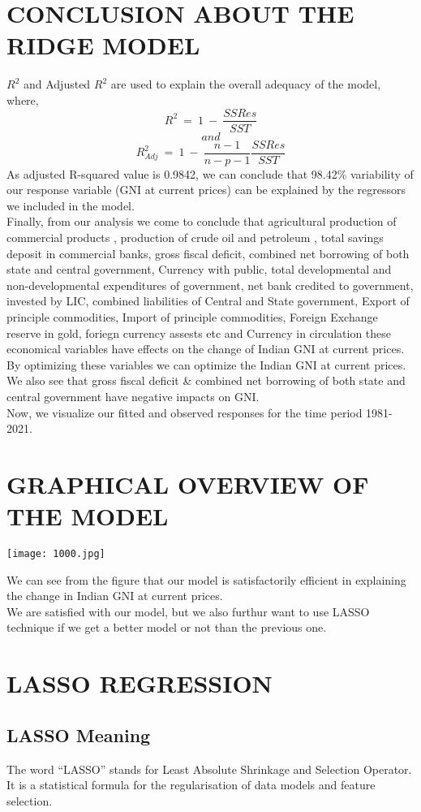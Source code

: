 \documentclass[a4paper,12pt,twoside]{book}
\begin{document}
\section{CONCLUSION ABOUT THE RIDGE MODEL}
$R^2$ and Adjusted $R^2$ are used to explain the overall adequacy of the model, where,
\[R^2\:=\:1\:-\:\frac{SSRes}{SST}\]
\[and\]
\[R^2_{Adj}\:=\:1\:-\:\frac{n-1}{n-p-1}\frac{SSRes}{SST}\]
As adjusted R-squared value is 0.9842, we can conclude that 98.42\% variability of our response variable (GNI at current prices) can be explained by the regressors we included in the model.\\
Finally, from our analysis we come to conclude that agricultural production of commercial products , production of crude oil and petroleum , total savings deposit in commercial banks, gross fiscal deficit, combined net borrowing of both state and central government, Currency with public, total developmental and non-developmental expenditures of government, net bank credited to government, invested by LIC, combined liabilities of Central and State government, Export of principle commodities, Import of principle commodities, Foreign Exchange reserve in gold, foriegn currency assests etc and Currency in circulation these economical variables have effects on the change of Indian GNI at current prices. By optimizing these variables we can optimize the Indian GNI at current prices. We also see that gross fiscal deficit & combined net borrowing of both state and central government have negative impacts on GNI.\\
Now, we visualize our fitted and observed responses for the time period 1981-2021.
\section{GRAPHICAL OVERVIEW OF THE MODEL}
\begin{center}
\texttt{[image: 1000.jpg]}\\
\end{center}
We can see from the figure that our model is satisfactorily efficient in explaining the change in Indian GNI at current prices.\\
We are satisfied with our model, but we also furthur want to use LASSO technique if we get a better model or not than the previous one.  
\newpage
\section{LASSO REGRESSION}
\subsection{LASSO Meaning}
The word “LASSO” stands for Least Absolute Shrinkage and Selection Operator. It is a statistical formula for the regularisation of data models and feature selection.\\
\end{document}
